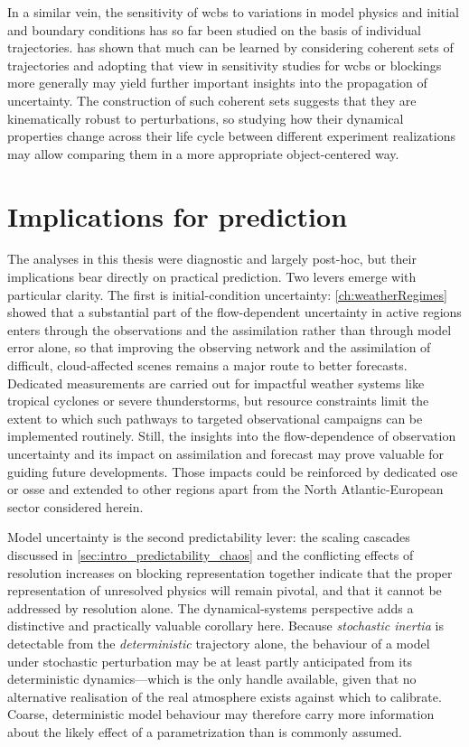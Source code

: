 In a similar vein, the sensitivity of \glspl{wcb} to variations in model
physics and initial and boundary conditions has so far been studied on the
basis of individual trajectories.  has shown that much
can be learned by considering coherent sets of trajectories and adopting that
view in sensitivity studies for \glspl{wcb} or blockings more generally may
yield further important insights into the propagation of uncertainty. The
construction of such coherent sets suggests that they are kinematically robust
to perturbations, so studying how their dynamical properties change across
their life cycle between different experiment realizations may allow comparing
them in a more appropriate object-centered way.

\section{Implications for prediction}

The analyses in this thesis were diagnostic and largely post-hoc, but their
implications bear directly on practical prediction. Two levers emerge with
particular clarity. The first is initial-condition uncertainty:
\cref{ch:weatherRegimes}
showed that a substantial part of the flow-dependent uncertainty in active
regions enters through the observations and the assimilation rather than
through model error alone, so that improving the observing network and the
assimilation of difficult, cloud-affected scenes remains a major route to
better forecasts. Dedicated measurements are carried out for
impactful weather systems like tropical cyclones
or severe thunderstorms, but resource constraints limit the extent to which
such pathways to targeted observational campaigns can be implemented
routinely. Still, the insights into the flow-dependence of observation
uncertainty and its impact on assimilation and forecast may prove valuable
for guiding future developments. Those impacts could be
reinforced by dedicated \gls{ose} or \gls{osse} and extended to other regions
apart from the North Atlantic-European sector considered herein.

\medskip

Model uncertainty is the second predictability lever: the scaling cascades
discussed in \cref{sec:intro_predictability_chaos} and the conflicting effects
of resolution increases on blocking representation together indicate that the
proper
representation of unresolved physics will remain pivotal, and that it cannot
be addressed by resolution alone. The dynamical-systems perspective adds a
distinctive and practically valuable corollary here. Because \emph{stochastic
      inertia} is detectable from the \emph{deterministic} trajectory alone,
the
behaviour of a model under stochastic perturbation may be at least partly
anticipated from its deterministic dynamics---which is the only handle
available, given that no alternative realisation of the real atmosphere
exists against which to calibrate. Coarse, deterministic model behaviour may
therefore carry more information about the likely effect of a
parametrization than is commonly assumed.

